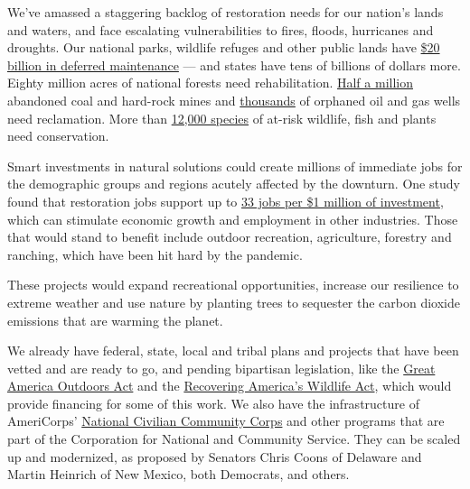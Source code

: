 We've amassed a staggering backlog of restoration needs for our nation's
lands and waters, and face escalating vulnerabilities to fires, floods,
hurricanes and droughts. Our national parks, wildlife refuges and other
public lands have \href{https://fas.org/sgp/crs/misc/R43997.pdf}{\$20
billion in deferred maintenance} --- and states have tens of billions of
dollars more. Eighty million acres of national forests need
rehabilitation.
\href{https://www.abandonedmines.gov/extent_of_the_problem}{Half a
million} abandoned coal and hard-rock mines and
\href{http://iogcc.ok.gov/Websites/iogcc/images/Publications/2019\%2012\%2031\%20Idle\%20and\%20Orphan\%20oil\%20and\%20gas\%20wells\%20-\%20state\%20and\%20provincial\%20regulatory\%20strategies\%20(2019).pdf}{thousands}
of orphaned oil and gas wells need reclamation. More than
\href{https://www.nwf.org/-/media/Documents/PDFs/NWF-Reports/2018/Reversing-Americas-Wildlife-Crisis_2018.ashx}{12,000
species} of at-risk wildlife, fish and plants need conservation.

Smart investments in natural solutions could create millions of
immediate jobs for the demographic groups and regions acutely affected
by the downturn. One study found that restoration jobs support up to
\href{https://curs.unc.edu/files/2014/01/RestorationEconomy.pdf}{33 jobs
per \$1 million of investment}, which can stimulate economic growth and
employment in other industries. Those that would stand to benefit
include outdoor recreation, agriculture, forestry and ranching, which
have been hit hard by the pandemic.

These projects would expand recreational opportunities, increase our
resilience to extreme weather and use nature by planting trees to
sequester the carbon dioxide emissions that are warming the planet.

We already have federal, state, local and tribal plans and projects that
have been vetted and are ready to go, and pending bipartisan
legislation, like the
\href{https://www.congress.gov/bill/116th-congress/senate-bill/3422}{Great
America Outdoors Act} and the
\href{https://www.congress.gov/bill/116th-congress/house-bill/3742/}{Recovering
America's Wildlife Act}, which would provide financing for some of this
work. We also have the infrastructure of AmeriCorps'
\href{https://www.nationalservice.gov/programs/americorps/americorps-programs/americorps-nccc}{National
Civilian Community Corps} and other programs that are part of the
Corporation for National and Community Service. They can be scaled up
and modernized, as proposed by Senators Chris Coons of Delaware and
Martin Heinrich of New Mexico, both Democrats, and others.

